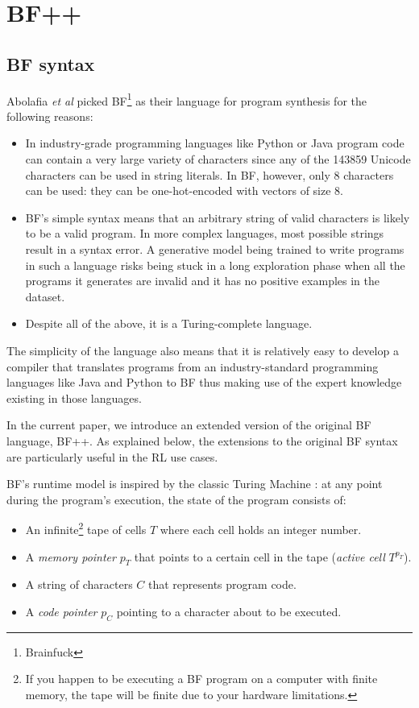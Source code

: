 \section{BF++}
\label{sec:language}

\subsection{BF syntax}
\label{sec:bf}

Abolafia {\sl et al} \cite{brain-coder} picked BF\footnote{Brainfuck} \cite{brainfuck} as their language for program synthesis for the following reasons:
\begin{itemize}
    \item In industry-grade programming languages like Python or Java program code can contain a very large variety of characters since any of the 143859 Unicode \cite{unicode} characters can be used in string literals. In BF, however, only 8 characters can be used: they can be one-hot-encoded with vectors of size 8. 
    \item BF's simple syntax means that an arbitrary string of valid characters is likely to be a valid program. 
    In more complex languages, most possible strings result in a syntax error. 
    A generative model being trained to write programs in such a language risks being stuck in a long exploration phase when all the programs it generates are invalid and it has no positive examples in the dataset.
    \item Despite all of the above, it is a Turing-complete language.
\end{itemize}

The simplicity of the language also means that it is relatively easy to develop a compiler that translates programs from an industry-standard programming languages like Java and Python to BF thus making use of the expert knowledge existing in those languages. 

In the current paper, we introduce an extended version of the original BF language, BF++. As explained below, the extensions to the original BF syntax are particularly useful in the RL use cases. 

BF's runtime model is inspired by the classic Turing Machine \cite{turing}: at any point during the program's execution, the state of the program consists of:

\begin{itemize}
    \item An infinite\footnote{If you happen to be executing a BF program on a computer with finite memory, the tape will be finite due to your hardware limitations.} tape of cells $T$ where each cell holds an integer number.
    \item A \textit{memory pointer} $p_T$ that points to a certain cell in the tape (\textit{active cell} $T^{p_T}$).
    \item A string of characters $C$ that represents program code.
    \item A \textit{code pointer} $p_C$ pointing to a character about to be executed.
\end{itemize}

